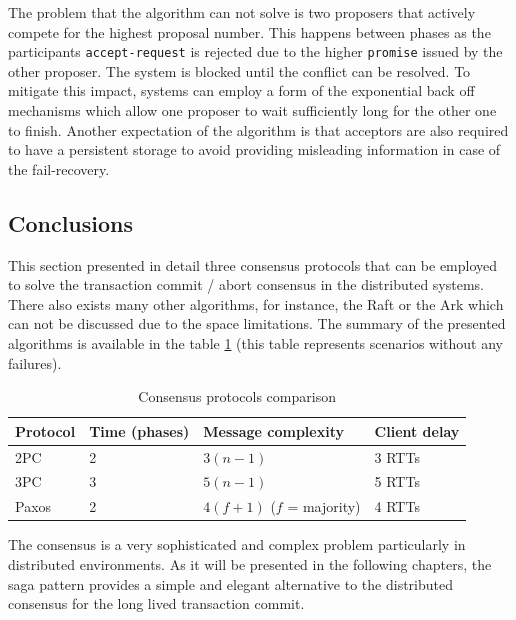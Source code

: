 \documentclass[oneside,
  digital, %
  table,   %
  nolof,     %
  nolot,     %
]{fithesis3}
\begin{document}
The problem that the algorithm can not solve is two proposers that actively compete for the highest proposal number. This happens between phases as the participants \texttt{accept-request} is rejected due to the higher \texttt{promise} issued by the other proposer. The system is blocked until the conflict can be resolved. To mitigate this impact, systems can employ a form of the exponential back off mechanisms which allow one proposer to wait sufficiently long for the other one to finish. Another expectation of the algorithm is that acceptors are also required to have a persistent storage to avoid providing misleading information in case of the fail-recovery.

\subsection{Conclusions}

This section presented in detail three consensus protocols that can be employed to solve the transaction commit / abort consensus in the distributed systems. There also exists many other algorithms, for instance, the Raft or the Ark which can not be discussed due to the space limitations. The summary of the presented algorithms is available in the table \ref{tab:consensus-protocols-comparison} (this table represents scenarios without any failures).

\begin{table}
    \begin{tabularx}{\textwidth}{lllX}
        \toprule
        Protocol & Time (phases) & Message complexity & Client delay \\
        \midrule
        2PC & 2 & $3(n - 1)$ & 3 RTTs \\
        3PC & 3 & $5(n - 1)$ & 5 RTTs \\
        Paxos & 2 & $4(f + 1)$ ($f$ = majority) & 4 RTTs \\
        \bottomrule
    \end{tabularx}
    \caption{Consensus protocols comparison}
    \label{tab:consensus-protocols-comparison}
\end{table}

The consensus is a very sophisticated and complex problem particularly in distributed environments. As it will be presented in the following chapters, the saga pattern \cite{sagas_publ} provides a simple and elegant alternative to the distributed consensus for the long lived transaction commit.
\end{document}

